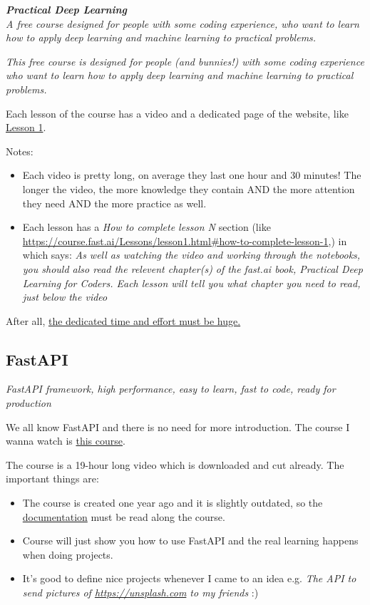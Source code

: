 \documentclass[12pt, dvipsnames, svgnames, x11names]{article}
\begin{document}
			\textbf{\textit{Practical Deep Learning}} \\
			\textit{A free course designed for people with some coding experience, who want to learn how to apply deep learning and machine learning to practical problems.}
			
			\textit{This free course is designed for people (and bunnies!) with some coding experience who want to learn how to apply deep learning and machine learning to practical problems.}
			
			Each lesson of the course has a video and a dedicated page of the website, like \href{https://course.fast.ai/Lessons/lesson1.html}{Lesson 1}. 
			
			Notes:
			\begin{itemize}
				\item Each video is pretty long, on average they last one hour and 30 minutes! The longer the video, the more knowledge they contain AND the more attention they need AND the more practice as well.
				
				\item Each lesson has a \textit{How to complete lesson N} section (like \url{https://course.fast.ai/Lessons/lesson1.html#how-to-complete-lesson-1},) in which says: \textit{As well as watching the video and working through the notebooks, you should also read the relevent chapter(s) of the fast.ai book, Practical Deep Learning for Coders. Each lesson will tell you what chapter you need to read, just below the video}
			\end{itemize}
		
		    After all, \underline{the dedicated time and effort must be huge.}
		    	
		\subsection{FastAPI}
			\textit{FastAPI framework, high performance, easy to learn, fast to code, ready for production}
			
			We all know FastAPI and there is no need for more introduction.
			The course I wanna watch is \href{https://youtu.be/0sOvCWFmrtA}{this course}.
			
			The course is a 19-hour long video which is downloaded and cut already. The important things are:
			\begin{itemize}
				\item The course is created one year ago and it is slightly outdated, so the \href{https://fastapi.tiangolo.com}{documentation} must be read along the course.
				
				\item Course will just show you how to use FastAPI and the real learning happens when doing projects.
				
				\item It's good to define nice projects whenever I came to an idea
				e.g. \textit{The API to send pictures of \url{https://unsplash.com} to my friends} :)
			\end{itemize}
	
\end{document}
